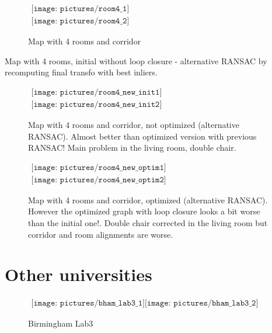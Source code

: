 \begin{figure}[h]
\centering$
\begin{array}{c}
\texttt{[image: pictures/room4\_1]}\\
\texttt{[image: pictures/room4\_2]}
\end{array}$
\caption{Map with 4 rooms and corridor}
\end{figure}

\clearpage

Map with 4 rooms, initial without loop closure - alternative RANSAC by recomputing final transfo with best inliers.

\begin{figure}[h]
\centering$
\begin{array}{c}
\texttt{[image: pictures/room4\_new\_init1]}\\
\texttt{[image: pictures/room4\_new\_init2]}
\end{array}$
\caption{Map with 4 rooms and corridor, not optimized (alternative RANSAC). Almost better than optimized version with previous RANSAC! Main problem in the living room, double chair.}
\end{figure}

\clearpage

\begin{figure}[h]
\centering$
\begin{array}{c}
\texttt{[image: pictures/room4\_new\_optim1]}\\
\texttt{[image: pictures/room4\_new\_optim2]}
\end{array}$
\caption{Map with 4 rooms and corridor, optimized (alternative RANSAC). However the optimized graph with loop closure looks a bit worse than the initial one!. Double chair corrected in the living room but corridor and room alignments are worse.}
\end{figure}

\clearpage

\section{Other universities}

\begin{figure}[h]
\centering$
\begin{array}{c}
\texttt{[image: pictures/bham\_lab3\_1]}
\texttt{[image: pictures/bham\_lab3\_2]}
\end{array}$
\caption{Birmingham Lab3}
\end{figure}


